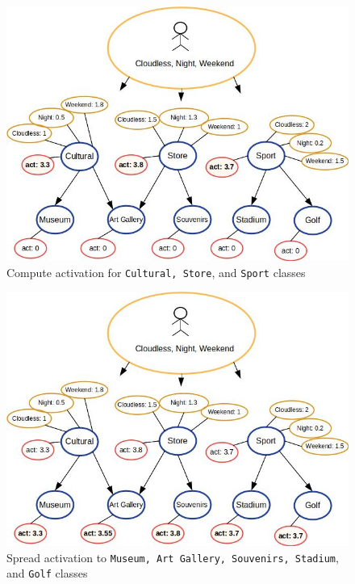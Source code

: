 \begin{figure}[h]
\vspace{-0.3cm}
\centering
\includegraphics[scale=0.39]{draws/high_act.jpg}
\vspace{-0.3cm}
\caption{Compute activation for {\tt Cultural, Store}, and {\tt Sport} classes}
\label{fig:high_act}
\vspace{-0.3cm}
\end{figure}

\begin{figure}[h]
\vspace{-0.3cm}
\centering
\includegraphics[scale=0.39]{draws/spread_act.jpg}
\vspace{-0.3cm}
\caption{Spread activation to {\tt Museum, Art Gallery, Souvenirs, Stadium}, and {\tt Golf} classes}
\label{fig:spread_act}
\vspace{-0.3cm}
\end{figure}

